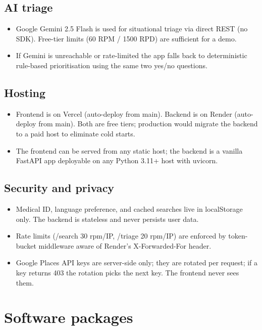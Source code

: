 \documentclass[11pt, a4paper]{article}
\begin{document}
\subsection{AI triage}
\begin{itemize}
  \item Google Gemini 2.5 Flash is used for situational triage via direct REST (no SDK). Free-tier limits (60 RPM / 1500 RPD) are sufficient for a demo.
  \item If Gemini is unreachable or rate-limited the app falls back to deterministic rule-based prioritisation using the same two yes/no questions.
\end{itemize}

\subsection{Hosting}
\begin{itemize}
  \item Frontend is on Vercel (auto-deploy from main). Backend is on Render (auto-deploy from main). Both are free tiers; production would migrate the backend to a paid host to eliminate cold starts.
  \item The frontend can be served from any static host; the backend is a vanilla FastAPI app deployable on any Python 3.11+ host with uvicorn.
\end{itemize}

\subsection{Security and privacy}
\begin{itemize}
  \item Medical ID, language preference, and cached searches live in localStorage only. The backend is stateless and never persists user data.
  \item Rate limits (/search 30 rpm/IP, /triage 20 rpm/IP) are enforced by token-bucket middleware aware of Render's X-Forwarded-For header.
  \item Google Places API keys are server-side only; they are rotated per request; if a key returns 403 the rotation picks the next key. The frontend never sees them.
\end{itemize}


\section{Software packages}
\end{document}
